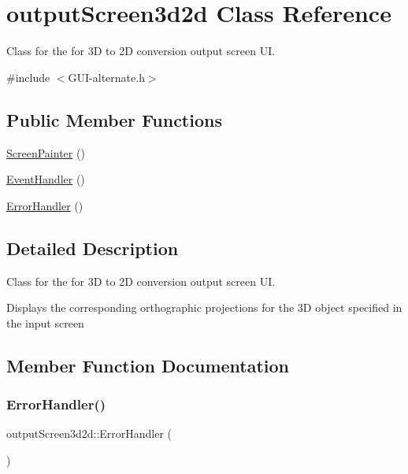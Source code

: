 \hypertarget{classoutput_screen3d2d}{}\section{output\+Screen3d2d Class Reference}
\label{classoutput_screen3d2d}


Class for the for 3D to 2D conversion output screen UI.  




{\ttfamily \#include $<$G\+U\+I-\/alternate.\+h$>$}

\subsection*{Public Member Functions}
\begin{DoxyCompactItemize}
\item 
\mbox{\hyperlink{classoutput_screen3d2d_aacf51b800ca899603b25faafd69611a5}{Screen\+Painter}} ()
\item 
\mbox{\hyperlink{classoutput_screen3d2d_a4624964767f34df730144d49676c4816}{Event\+Handler}} ()
\item 
\mbox{\hyperlink{classoutput_screen3d2d_adf23d1bdf5473a4a3e4f14956f764567}{Error\+Handler}} ()
\end{DoxyCompactItemize}


\subsection{Detailed Description}
Class for the for 3D to 2D conversion output screen UI. 

Displays the corresponding orthographic projections for the 3D object specified in the input screen 

\subsection{Member Function Documentation}
\mbox{\label{classoutput_screen3d2d_adf23d1bdf5473a4a3e4f14956f764567}} 
\subsubsection{\texorpdfstring{Error\+Handler()}{ErrorHandler()}}
{\footnotesize\ttfamily output\+Screen3d2d\+::\+Error\+Handler (\begin{DoxyParamCaption}{ }\end{DoxyParamCaption})}

